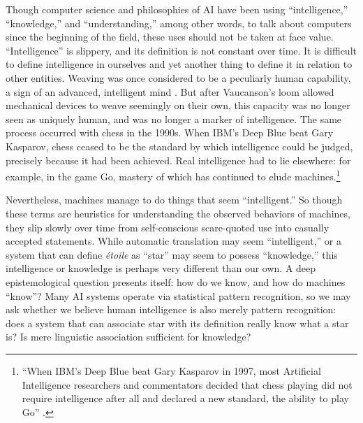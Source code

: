 Though computer science and philosophies of AI have been using
``intelligence,'' ``knowledge,'' and ``understanding,'' among other
words, to talk about computers since the beginning of the field, these
uses should not be taken at face value. ``Intelligence'' is slippery,
and its definition is not constant over time. It is difficult to
define intelligence in ourselves \cite{huntIntelligence} and yet another thing to define it
in relation to other entities. Weaving was once considered to be a
peculiarly human capability, a sign of an advanced, intelligent
mind \cite[p. 627]{riskinDuck}. But after Vaucanson's loom allowed mechanical devices to weave
seemingly on their own, this capacity was no longer seen as uniquely
human, and was no longer a marker of intelligence. The same process
occurred with chess in the 1990s. When IBM's Deep Blue beat Gary
Kasparov, chess ceased to be the standard by which intelligence could
be judged, precisely because it had been achieved. Real intelligence
had to lie elsewhere: for example, in the game Go, mastery of which
has continued to elude machines.\footnote{``When IBM's Deep Blue beat
  Gary Kasparov in 1997, most Artificial Intelligence researchers and
  commentators decided that chess playing did not require intelligence
  after all and declared a new standard, the ability to play Go'' \cite[p. 623]{riskinDuck}.}

Nevertheless, machines manage to do things that seem ``intelligent.'' So
though these terms are heuristics for understanding the observed
behaviors of machines, they slip slowly over time from self-conscious
scare-quoted use into casually accepted statements. While automatic
translation may seem ``intelligent,'' or a system that can define \emph{\'{e}toile}
as ``star'' may seem to possess ``knowledge,'' this intelligence or
knowledge is perhaps very different than our own. A deep
epistemological question presents itself: how do we know, and how do
machines ``know''? Many AI systems operate via statistical pattern
recognition, so we may ask whether we believe human intelligence is
also merely pattern recognition: does a system that can associate star
with its definition really know what a star is? Is mere linguistic
association sufficient for knowledge?

